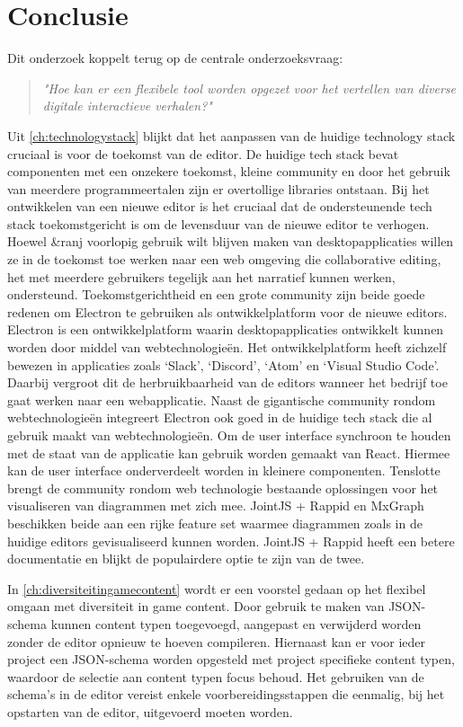 \chapter{Conclusie}
\label{ch:conclusion}
Dit onderzoek koppelt terug op de centrale onderzoeksvraag: 
\begin{quote} 
    \centering
    \large
    \textit{
        "Hoe kan er een flexibele tool worden opgezet voor het vertellen van diverse digitale interactieve verhalen?"
    }
\end{quote}

Uit \autoref{ch:technologystack} blijkt dat het aanpassen van de huidige technology stack cruciaal is voor de toekomst van de editor. De huidige tech stack bevat componenten met een onzekere toekomst, kleine community en door het gebruik van meerdere programmeertalen zijn er overtollige libraries ontstaan. Bij het ontwikkelen van een nieuwe editor is het cruciaal dat de ondersteunende tech stack toekomstgericht is om de levensduur van de nieuwe editor te verhogen. Hoewel \&ranj voorlopig gebruik wilt blijven maken van desktopapplicaties willen ze in de toekomst toe werken naar een web omgeving die collaborative editing, het met meerdere gebruikers tegelijk aan het narratief kunnen werken, ondersteund. Toekomstgerichtheid en een grote community zijn beide goede redenen om Electron te gebruiken als ontwikkelplatform voor de nieuwe editors. Electron is een ontwikkelplatform waarin desktopapplicaties ontwikkelt kunnen worden door middel van webtechnologieën. Het ontwikkelplatform heeft zichzelf bewezen in applicaties zoals ‘Slack’, ‘Discord’, ‘Atom’ en ‘Visual Studio Code’. Daarbij vergroot dit de herbruikbaarheid van de editors wanneer het bedrijf toe gaat werken naar een webapplicatie. Naast de gigantische community rondom webtechnologieën integreert Electron ook goed in de huidige tech stack die al gebruik maakt van webtechnologieën. Om de user interface synchroon te houden met de staat van de applicatie kan gebruik worden gemaakt van React. Hiermee kan de user interface onderverdeelt worden in kleinere componenten. Tenslotte brengt de community rondom web technologie bestaande oplossingen voor het visualiseren van diagrammen met zich mee. JointJS + Rappid en MxGraph beschikken beide aan een rijke feature set waarmee diagrammen zoals in de huidige editors gevisualiseerd kunnen worden. JointJS + Rappid heeft een betere documentatie en blijkt de populairdere optie te zijn van de twee. 

In \autoref{ch:diversiteitingamecontent} wordt er een voorstel gedaan op het flexibel omgaan met diversiteit in game content. Door gebruik te maken van JSON-schema kunnen content typen toegevoegd, aangepast en verwijderd worden zonder de editor opnieuw te hoeven compileren. Hiernaast kan er voor ieder project een JSON-schema worden opgesteld met project specifieke content typen, waardoor de selectie aan content typen focus behoud. Het gebruiken van de schema’s in de editor vereist enkele voorbereidingsstappen die eenmalig, bij het opstarten van de editor, uitgevoerd moeten worden.

